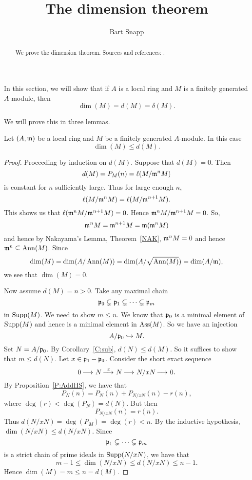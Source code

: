 \documentclass{ximera}
\author{Bart Snapp}
\title{The dimension theorem}
\begin{document}
\begin{abstract}
  We prove the dimension theorem. Sources and
  references: \cite{sD2008,hM1986}.
\end{abstract}
\maketitle


In this section, we will show that if $A$ is a local ring and $M$ is a
finitely generated $A$-module, then
\[
\dim(M) = d(M) = \delta(M). 
\]

We will prove this in three lemmas.

\begin{lemma}
  Let $(A,\mathfrak{m})$ be a local ring and $M$ be a finitely generated
  $A$-module. In this case
  \[
  \dim(M)\le d(M).
  \]
  \begin{proof}
    Proceeding by induction on $d(M)$. Suppose that $d(M) = 0$. Then 
    \[
    d(M) = P_M(n) = \ell(M/\mathfrak{m}^n M)
    \]
    is constant for $n$ sufficiently large. Thus for large enough $n$,
    \[
    \ell(M/\mathfrak{m}^n M) = \ell(M/\mathfrak{m}^{n+1}M).
    \]
    This shows us that $\ell(\mathfrak{m}^n M/\mathfrak{m}^{n+1}M) = 0$. Hence $\mathfrak{m}^n
    M/\mathfrak{m}^{n+1}M = 0$. So,
    \[
    \mathfrak{m}^n M = \mathfrak{m}^{n+1}M = \mathfrak{m}(\mathfrak{m}^n M)
    \]
    and hence by Nakayama's Lemma,
    Theorem~\ref{NAK}, $\mathfrak{m}^n M =0$ and hence
    $\mathfrak{m}^n\subseteq\operatorname{Ann}(M)$. Since
    \[
    \dim(M) = \dim(A/\operatorname{Ann}(M))  = \dim(A/\sqrt{\operatorname{Ann}(M)}) = \dim(A/\mathfrak{m}),
    \]   
    we see that $\dim(M) = 0$. 
    
    Now assume $d(M) = n> 0$. Take any maximal chain 
    \[
    \mathfrak{p}_0\subsetneq \mathfrak{p}_1 \subsetneq \cdots \subsetneq \mathfrak{p}_m
    \]
    in $\operatorname{Supp}(M)$.  We need to show $m\le n$. We know that $\mathfrak{p}_0$ is a
    minimal element of $\operatorname{Supp}(M)$ and hence is a minimal element in
    $\operatorname{Ass}(M)$.  So we have an injection
    \[
    A/\mathfrak{p}_0\hookrightarrow M.
    \]
    Set $N = A/\mathfrak{p}_0$.  By Corollary~\ref{C:sub}, $d(N) \le d(M)$.  So
    it suffices to show that $m \le d(N)$.  Let $x \in \mathfrak{p}_1 - \mathfrak{p}_0$.
    Consider the short exact sequence
    \[
    0\mathop{\longrightarrow\,}\limits N \mathop{\longrightarrow\,}\limits^{x} N \mathop{\longrightarrow\,}\limits N/xN \mathop{\longrightarrow\,}\limits 0.
    \]
    By Proposition~\ref{P:AddHS}, we have that
    \[
    P_N(n) = P_N(n) + P_{N/xN}(n) - r(n),
    \]
    where $\deg(r) < \deg(P_N) = d(N)$.  But then
    \[
    P_{N/xN}(n) = r(n).
    \]
    Thus $d(N/xN) = \deg(P_M) = \deg(r) < n$.  By the
    inductive hypothesis, $\dim(N/xN) \le d(N/xN)$.  Since
    \[
    \mathfrak{p}_1 \subsetneq \cdots \subsetneq \mathfrak{p}_m
    \]
    is a strict chain of prime ideals in $\operatorname{Supp}(N/xN)$, we have that
    \[
    m - 1 \le \dim(N/xN) \le d(N/xN) \le n - 1.
    \]
    Hence $\dim(M) = m \le n = d(M)$.
  \end{proof}
\end{lemma}
\end{document}
